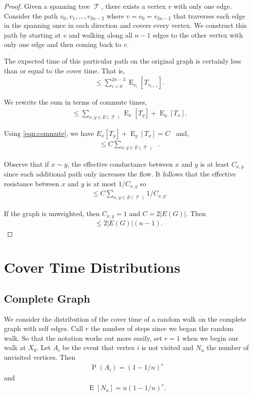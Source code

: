 \documentclass[12pt]{article}
\theoremstyle{definition}
\DeclareMathOperator{\E}{\mathrm{E}}		     %
\DeclareMathOperator{\pr}{\mathrm{P}}		     %
\DeclareMathOperator{\tcov}{t_\textrm{cov}}      %
\DeclareMathOperator{\Rxy}{R_{\textrm{x,y}}}     %
\DeclareMathOperator{\T}{\mathcal{T}}            %
\begin{document}
\begin{proof}
Given a spanning tree $\T$, there exists a vertex $v$ with only one edge.
Consider the path $v_0, v_1, \ldots, v_{2n-2}$ where $v=v_0=v_{2n-2}$
that traverses each edge in the spanning once in each direction
and covers every vertex.
We construct this path by starting at $v$ and walking along all $n-1$ edges to the
other vertex with only one edge and then coming back to $v$.

The expected time of this particular path on the original graph is certainly less than
or equal to the cover time. That is,
\begin{align}
\tcov &\leq \sum_{i=0}^{2n-3} \E_{v_i}[T_{v_{i+1}}]. \nonumber
\end{align}

We rewrite the sum in terms of commute times,
\begin{align}
\tcov &\leq \sum_{x,y \in E(\T)} \E_x[T_y] + \E_y[T_x]. \nonumber
\end{align}

Using \cref{eqn:commute}, we have $E_x[T_y] + \E_y[T_x] = C \Rxy$ and,
\begin{align}
\tcov &\leq C \sum_{x,y \in E(\T)} \Rxy. \nonumber
\end{align}

Observe that if $x \sim y$,
the effective conductance between $x$ and $y$ is at least $C_{x,y}$
since each additional path only increases the flow.
It follows that the effective resistance between $x$ and $y$ is at most $1 / C_{x,y}$ so
\begin{align}
\tcov &\leq C \sum_{x,y \in E(\T)} 1 / C_{x,y}. \nonumber
\end{align}

If the graph is unweighted, then $C_{x,y} = 1$ and $C = 2 |E(G)|$.
Then
\begin{align}
\tcov \leq 2 |E(G)| (n-1). \nonumber
\end{align}

\end{proof}


\section{Cover Time Distributions}\label{sec:dist}
\subsection{Complete Graph}\label{sec:complete_dist}
\cite{Du11}
We consider the distribution of the cover time of a random walk
on the complete graph with self edges.
Call $r$ the number of steps since we began the random walk.
So that the notation works out more easily,
set $r=1$ when we begin our walk at $X_0$.
Let $A_i$ be the event that vertex $i$ is not visited and
$N_n$ the number of unvisited vertices.
Then
\begin{align}
\pr(A_i) = (1-1/n)^r \nonumber
\end{align}
and
\begin{align}
\E[N_n] = n(1-1/n)^r. \nonumber
\end{align}
\end{document}

